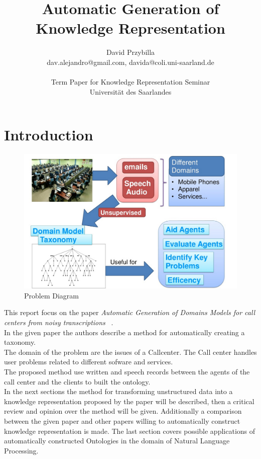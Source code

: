 \documentclass[4pt,a4paper,twocolumn]{article}
\author{David Przybilla\\dav.alejandro@gmail.com, davida@coli.uni-saarland.de\\ \\ Term Paper for Knowledge Representation Seminar\\ Universit\"{a}t des Saarlandes}
\title{Automatic Generation of Knowledge Representation}
\begin{document}
\twocolumn[
	 \begin{@twocolumnfalse}
    \maketitle
  \end{@twocolumnfalse}
 ]




\section{Introduction}


\begin{figure}[]
  \centering
    \includegraphics[scale=0.2]{pics/problem.jpg}
    \caption{Problem Diagram}
   \label{fig:problem}  
\end{figure}



This report focus on the paper \textit{Automatic Generation of Domains Models for call centers from noisy transcriptions} ~\cite{Roy:2006:AGD:1220175.1220268}.\\
In the given paper the authors describe a method for automatically creating a taxonomy.\\
The domain of the problem are the issues of a Callcenter. The Call center handles user problems related to different sofware and services.\\
The proposed method use  written and speech records between the agents of the call center and the clients to built the ontology. \\
In the next sections  the method for transforming unstructured data into a knowledge representation proposed by the paper will be described,
then a critical review and opinion over the method will be given. Additionally a comparison between the given paper and other papers willing to automatically construct knowledge representation is made.
The last section covers  possible applications of automatically constructed Ontologies in the domain of Natural Language Processing.
\end{document}

